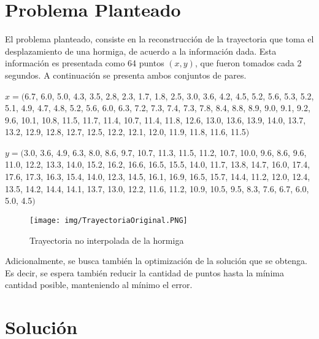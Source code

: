 \documentclass[conference]{IEEEtran}
\begin{document}
\section{Problema Planteado}

El problema planteado, consiste en la reconstrucción de la trayectoria que toma el desplazamiento de una hormiga, de acuerdo a la información dada. Esta información es presentada como 64 puntos $(x,y)$, que fueron tomados cada 2 segundos. A continuación se presenta ambos conjuntos de pares. \par

$x=($6.7, 6.0, 5.0, 4.3, 3.5, 2.8, 2.3, 1.7, 1.8, 2.5, 3.0, 3.6, 4.2, 4.5, 5.2, 5.6, 5.3, 5.2, 5.1, 4.9, 4.7, 4.8, 5.2, 5.6, 6.0, 6.3, 7.2, 7.3, 7.4, 7.3, 7.8, 8.4, 8.8, 8.9, 9.0, 9.1, 9.2, 9.6, 10.1, 10.8, 11.5, 11.7, 11.4, 10.7, 11.4, 11.8, 12.6, 13.0, 13.6, 13.9, 14.0, 13.7, 13.2, 12.9, 12.8, 12.7, 12.5, 12.2, 12.1, 12.0, 11.9, 11.8, 11.6, 11.5$)$ \par

$y=($3.0, 3.6, 4.9, 6.3, 8.0, 8.6, 9.7, 10.7, 11.3, 11.5, 11.2, 10.7, 10.0, 9.6, 8.6, 9.6, 11.0, 12.2, 13.3, 14.0, 15.2, 16.2, 16.6, 16.5, 15.5, 14.0, 11.7, 13.8, 14.7, 16.0, 17.4, 17.6, 17.3, 16.3, 15.4, 14.0, 12.3, 14.5, 16.1, 16.9, 16.5, 15.7, 14.4, 11.2, 12.0, 12.4, 13.5, 14.2, 14.4, 14.1, 13.7, 13.0, 12.2, 11.6, 11.2, 10.9, 10.5, 9.5, 8.3, 7.6, 6.7, 6.0, 5.0, 4.5$)$ \par


\vspace{-1em}

\begin{figure}[ht!]
\centering
\texttt{[image: img/TrayectoriaOriginal.PNG]}
\vspace{-1em}
\caption{Trayectoria no interpolada de la hormiga}
\label{fig:trayectoria-original}
\end{figure} 

Adicionalmente, se busca también la optimización de la solución que se obtenga. Es decir, se espera también reducir la cantidad de puntos hasta la mínima cantidad posible, manteniendo al mínimo el error.\par


\section{Solución}
\end{document}
